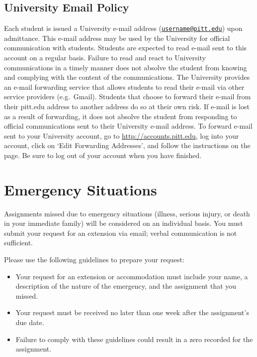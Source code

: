 \documentclass[
]{book}
\providecommand{\tightlist}{%
  \setlength{\itemsep}{0pt}\setlength{\parskip}{0pt}}
\begin{document}
\hypertarget{university-email-policy}{%
\section{University Email Policy}\label{university-email-policy}}

Each student is issued a University e-mail address (\href{mailto:username@pitt.edu}{\nolinkurl{username@pitt.edu}}) upon admittance. This e-mail address may be used by the University for official communication with students. Students are expected to read e-mail sent to this account on a regular basis. Failure to read and react to University communications in a timely manner does not absolve the student from knowing and complying with the content of the communications. The University provides an e-mail forwarding service that allows students to read their e-mail via other service providers (e.g.~Gmail). Students that choose to forward their e-mail from their pitt.edu address to another address do so at their own risk. If e-mail is lost as a result of forwarding, it does not absolve the student from responding to official communications sent to their University e-mail address. To forward e-mail sent to your University account, go to \url{http://accounts.pitt.edu}, log into your account, click on `Edit Forwarding Addresses', and follow the instructions on the page. Be sure to log out of your account when you have finished.

\hypertarget{emergency-situations}{%
\chapter{Emergency Situations}\label{emergency-situations}}

Assignments missed due to emergency situations (illness, serious injury, or death in your immediate family) will be considered on an individual basis. You must submit your request for an extension via email; verbal communication is not sufficient.

Please use the following guidelines to prepare your request:

\begin{itemize}
\tightlist
\item
  Your request for an extension or accommodation must include your name, a description of the nature of the emergency, and the assignment that you missed.
\item
  Your request must be received no later than one week after the assignment's due date.
\item
  Failure to comply with these guidelines could result in a zero recorded for the assignment.
\end{itemize}
\end{document}
